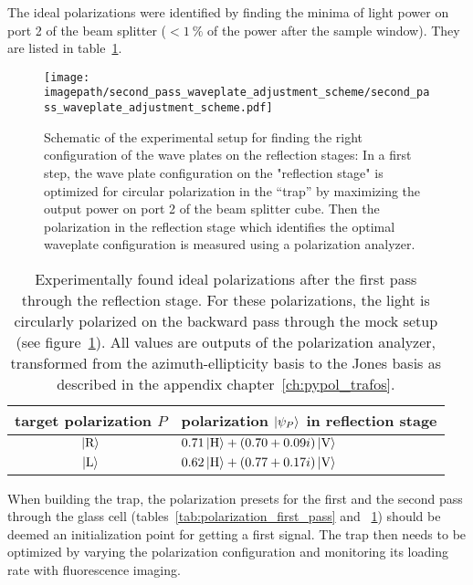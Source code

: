 The ideal polarizations were identified by finding the minima of light power on port 2 of the beam splitter ($< \SI{1}{\percent}$ of the power after the sample window). They are listed in table~\ref{tab:polarization_second_pass}.

\begin{figure}
    \centering
    \texttt{[image: \\imagepath/second\_pass\_waveplate\_adjustment\_scheme/second\_pass\_waveplate\_adjustment\_scheme.pdf]}
    \caption{Schematic of the experimental setup for finding the right configuration of the wave plates on the reflection stages: In a first step, the wave plate configuration on the "reflection stage" is optimized for circular polarization in the ``trap'' by maximizing the output power on port 2 of the beam splitter cube. Then the polarization in the reflection stage which identifies the optimal waveplate configuration is measured using a polarization analyzer.}\label{fig:second_pass_waveplate_adjustment_scheme}
\end{figure}

\begin{table}
    \centering
    \begin{tabular}{cl}
        \toprule
        \textbf{target polarization $P$} & \textbf{polarization $\Ket{\psi_P}$ in reflection stage} \\
        \toprule
        $\Ket{\text{R}}$ & $0.71 \Ket{\text{H}} + (0.70+0.09i) \Ket{\text{V}}$ \\
        $\Ket{\text{L}}$ & $0.62\Ket{\text{H}} + (0.77+0.17i)\Ket{\text{V}}$ \\
        \bottomrule
    \end{tabular}
    \caption{Experimentally found ideal polarizations after the first pass through the reflection stage. For these polarizations, the light is circularly polarized on the backward pass through the mock setup (see figure~\ref{fig:second_pass_waveplate_adjustment_scheme}). All values are outputs of the polarization analyzer, transformed from the azimuth-ellipticity basis to the Jones basis as described in the appendix chapter~\ref{ch:pypol_trafos}.}
    \label{tab:polarization_second_pass}
\end{table}

When building the trap, the polarization presets for the first and the second pass through the glass cell (tables~\ref{tab:polarization_first_pass} and ~\ref{tab:polarization_second_pass}) should be deemed an initialization point for getting a first signal. The trap then needs to be optimized by varying the polarization configuration and monitoring its loading rate with fluorescence imaging.

